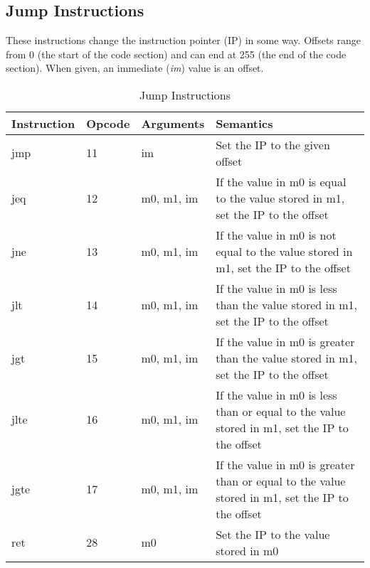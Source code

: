 \subsection{Jump Instructions}
These instructions change the instruction pointer (IP) in some way. Offsets
range from 0 (the start of the code section) and can end at 255 (the end of the
code section). When given, an immediate (\emph{im}) value is an offset.
\begin{table}[h!]
	\centering
	\caption{Jump Instructions}
	\begin{tabular}{|l|l|l|p{8cm}|}
		\hline
		Instruction & Opcode & Arguments & Semantics \\\hline
			       jmp & 11 & im & Set the IP to the given offset \\\hline
			       jeq & 12 & m0, m1, im & If the value in m0 is equal to the value stored
					in m1, set the IP to the offset \\\hline
			       jne & 13 & m0, m1, im & If the value in m0 is not equal to the value stored
					in m1, set the IP to the offset \\\hline
			       jlt & 14 & m0, m1, im & If the value in m0 is less than the value stored
					in m1, set the IP to the offset \\\hline
			       jgt & 15 & m0, m1, im & If the value in m0 is greater than the value stored
					in m1, set the IP to the offset \\\hline
			       jlte & 16 & m0, m1, im & If the value in m0 is less than 
					or equal to the value stored
					in m1, set the IP to the offset \\\hline
			       jgte & 17 & m0, m1, im & If the value in m0 is greater than 
					or equal to the value stored
					in m1, set the IP to the offset \\\hline
				ret & 28 & m0 & Set the IP to the value stored in m0 \\\hline
	\end{tabular}
\end{table}

\clearpage

